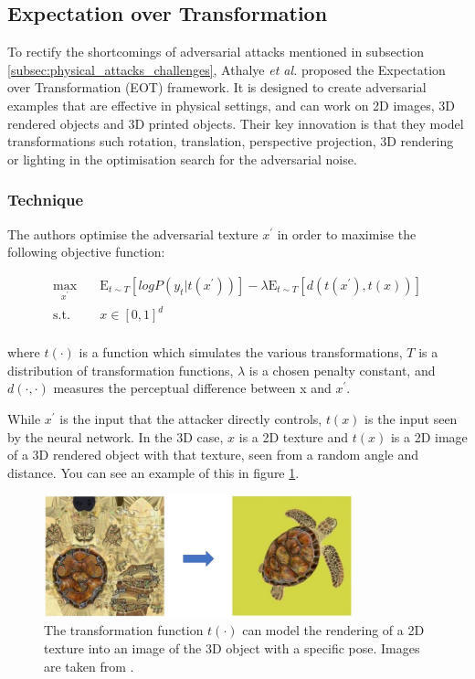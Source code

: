 \subsection{Expectation over Transformation}
    \label{subsec:eot}

To rectify the shortcomings of adversarial attacks mentioned in subsection \ref{subsec:physical_attacks_challenges}, Athalye \textit{et al.} \cite{athalye} proposed the Expectation over Transformation (EOT) framework. It is designed to create adversarial examples that are effective in physical settings, and can work on 2D images, 3D rendered objects and 3D printed objects. Their key innovation is that they model transformations such rotation, translation, perspective projection, 3D rendering or lighting in the optimisation search for the adversarial noise. 

\subsubsection{Technique}
    \label{subsubsec:eot_technique}

The authors optimise the adversarial texture $x^\prime$ in order to maximise the following objective function:

\begin{equation}
\label{eq:eot}
\begin{aligned}
\max_{x^\prime} \quad & \mathrm{E}_{t\sim T}[log P(y_{t} | t(x^\prime))] - \lambda \mathrm{E}_{t\sim T}[d(t(x^\prime), t(x))]\\
\textrm{s.t.} \quad & x \in [0, 1]^d   \\
\end{aligned}
\end{equation}

\noindent where $t(\cdot)$ is a function which simulates the various transformations, $T$ is a distribution of transformation functions, $\lambda$ is a chosen penalty constant, and $d(\cdot, \cdot)$ measures the perceptual difference between x and $x^\prime$.

While $x^\prime$ is the input that the attacker directly controls, $t(x)$ is the input seen by the neural network. In the 3D case, $x$ is a 2D texture and $t(x)$ is a 2D image of a 3D rendered object with that texture, seen from a random angle and distance. You can see an example of this in figure \ref{fig:rendering}. 

\begin{figure}[h]
    \centering
    \includegraphics[width=0.8\textwidth]{graphics/rendering.JPG}
    \caption{The transformation function $t(\cdot)$ can model the rendering of a 2D texture into an image of the 3D object with a specific pose. Images are taken from \cite{athalye}.}
    \label{fig:rendering}
\end{figure}

